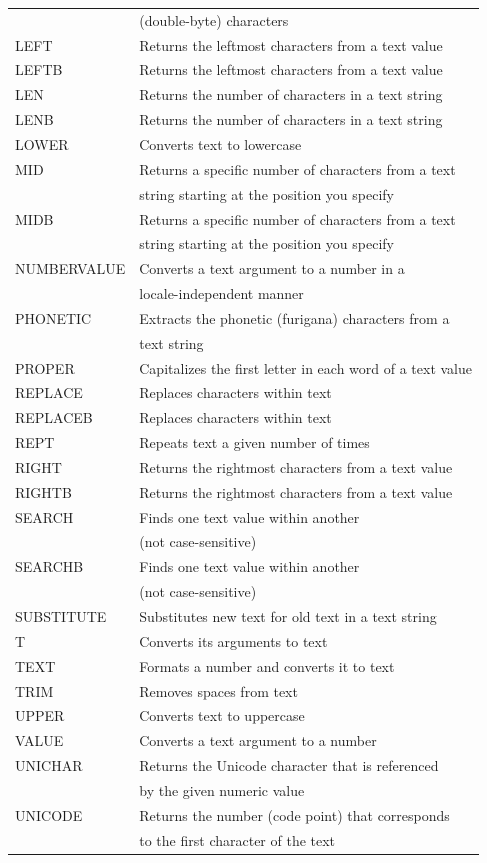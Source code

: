 \begin{center}
\begin{longtable}{l l  }
		& (double-byte) characters    \\
		LEFT& Returns the leftmost characters from a text value  \\
		LEFTB & Returns the leftmost characters from a text value  \\
		LEN & Returns the number of characters in a text string  \\
		LENB & Returns the number of characters in a text string \\
		LOWER & Converts text to lowercase   \\
		MID & Returns a specific number of characters from a text \\
		& string starting at the position you specify    \\
		MIDB & Returns a specific number of characters from a text  \\
		& string starting at the position you specify    \\
		NUMBERVALUE & Converts a text argument to a number in a   \\			
		& locale-independent manner    \\
		PHONETIC & Extracts the phonetic (furigana) characters from a  \\
		& text string    \\
		PROPER & Capitalizes the first letter in each word of a text value \\
		REPLACE & Replaces characters within text \\
		REPLACEB & Replaces characters within text \\
		REPT  & Repeats text a given number of times \\
		RIGHT & Returns the rightmost characters from a text value \\
		RIGHTB & Returns the rightmost characters from a text value \\
		SEARCH & Finds one text value within another  \\
		& (not case-sensitive)    \\
		SEARCHB & Finds one text value within another  \\
		& (not case-sensitive)    \\
		SUBSTITUTE & Substitutes new text for old text in a text string \\
		T     & Converts its arguments to text \\
		TEXT  & Formats a number and converts it to text \\
		TRIM  & Removes spaces from text \\
		UPPER & Converts text to uppercase \\
		VALUE & Converts a text argument to a number \\
		UNICHAR & Returns the Unicode character that is referenced  \\
		& by the given numeric value    \\
		UNICODE & Returns the number (code point) that corresponds  \\
		& to the first character of the text    \\
	\end{longtable}
\end{center}




